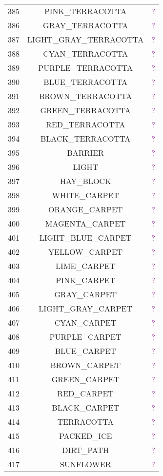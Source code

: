 \documentclass[11pt]{article}
\newcommand\myworries[1]{\textcolor{purple}{#1}}
\begin{document}
\begin{longtable}{ |c|c|c| }
	385 & PINK\_TERRACOTTA & \myworries{?} \\
	386 & GRAY\_TERRACOTTA & \myworries{?} \\
	387 & LIGHT\_GRAY\_TERRACOTTA & \myworries{?} \\
	388 & CYAN\_TERRACOTTA & \myworries{?} \\
	389 & PURPLE\_TERRACOTTA & \myworries{?} \\
	390 & BLUE\_TERRACOTTA & \myworries{?} \\
	391 & BROWN\_TERRACOTTA & \myworries{?} \\
	392 & GREEN\_TERRACOTTA & \myworries{?} \\
	393 & RED\_TERRACOTTA & \myworries{?} \\
	394 & BLACK\_TERRACOTTA & \myworries{?} \\
	395 & BARRIER & \myworries{?} \\
	396 & LIGHT & \myworries{?} \\
	397 & HAY\_BLOCK & \myworries{?} \\
	398 & WHITE\_CARPET & \myworries{?} \\
	399 & ORANGE\_CARPET & \myworries{?} \\
	400 & MAGENTA\_CARPET & \myworries{?} \\
	401 & LIGHT\_BLUE\_CARPET & \myworries{?} \\
	402 & YELLOW\_CARPET & \myworries{?} \\
	403 & LIME\_CARPET & \myworries{?} \\
	404 & PINK\_CARPET & \myworries{?} \\
	405 & GRAY\_CARPET & \myworries{?} \\
	406 & LIGHT\_GRAY\_CARPET & \myworries{?} \\
	407 & CYAN\_CARPET & \myworries{?} \\
	408 & PURPLE\_CARPET & \myworries{?} \\
	409 & BLUE\_CARPET & \myworries{?} \\
	410 & BROWN\_CARPET & \myworries{?} \\
	411 & GREEN\_CARPET & \myworries{?} \\
	412 & RED\_CARPET & \myworries{?} \\
	413 & BLACK\_CARPET & \myworries{?} \\
	414 & TERRACOTTA & \myworries{?} \\
	415 & PACKED\_ICE & \myworries{?} \\
	416 & DIRT\_PATH & \myworries{?} \\
	417 & SUNFLOWER & \myworries{?} \\

\end{longtable}
\end{document}

